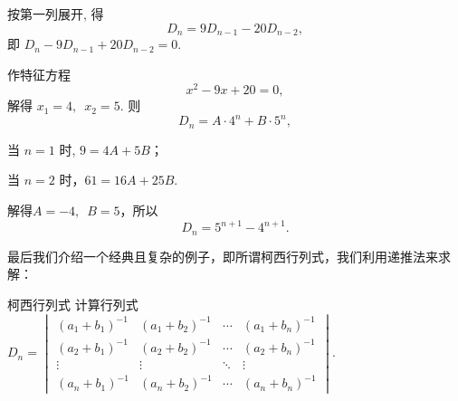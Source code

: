 \begin{solution}
    按第一列展开, 得
    \[ D_n=9 D_{n-1}-20 D_{n-2}, \]
    即 $ D_n-9 D_{n-1}+20 D_{n-2}=0 $.

    作特征方程
    \[ x^{2}-9 x+20=0, \]
    解得 $ x_1=4,\enspace x_2=5 $. 则
    \[ D_n=A \cdot 4^n+B \cdot 5^n, \]

    当 $n=1$ 时, $9=4A+5B$；

    当 $n=2$ 时，$61=16A+25B$.

    解得$A=-4,\enspace B=5$，所以
    \[ D_n=5^{n+1}-4^{n+1}. \]
\end{solution}

最后我们介绍一个经典且复杂的例子，即所谓柯西行列式，我们利用递推法来求解：

\begin{example}{柯西行列式}{}
    计算行列式 $D_n=\begin{vmatrix}
            (a_1+b_1)^{-1} & (a_1+b_2)^{-1} & \cdots & (a_1+b_n)^{-1} \\
            (a_2+b_1)^{-1} & (a_2+b_2)^{-1} & \cdots & (a_2+b_n)^{-1} \\
            \vdots         & \vdots         & \ddots & \vdots         \\
            (a_n+b_1)^{-1} & (a_n+b_2)^{-1} & \cdots & (a_n+b_n)^{-1}
        \end{vmatrix}$.
\end{example}

